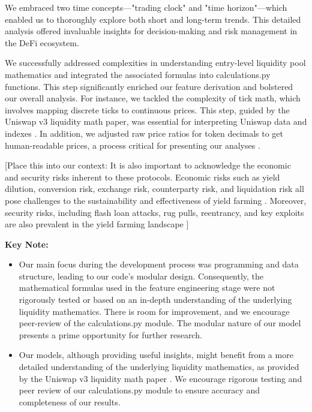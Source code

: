 \documentclass{article}
\begin{document}
We embraced two time concepts—"trading clock" and "time horizon"—which enabled us to thoroughly explore both short and long-term trends. This detailed analysis offered invaluable insights for decision-making and risk management in the DeFi ecosystem\cite{Miori2022}.

We successfully addressed complexities in understanding entry-level liquidity pool mathematics and integrated the associated formulas into calculations.py functions. This step significantly enriched our feature derivation and bolstered our overall analysis\cite{Elsts2021,Aigner2021}.
For instance, we tackled the complexity of tick math, which involves mapping discrete ticks to continuous prices. This step, guided by the Uniswap v3 liquidity math paper, was essential for interpreting Uniswap data and indexes \cite{Elsts2021}. In addition, we adjusted raw price ratios for token decimals to get human-readable prices, a process critical for presenting our analyses \cite{Elsts2021}.

[Place this into our context: It is also important to acknowledge the economic and security risks inherent to these protocols. Economic risks such as yield dilution, conversion risk, exchange risk, counterparty risk, and liquidation risk all pose challenges to the sustainability and effectiveness of yield farming \cite{Xu2023}. Moreover, security risks, including flash loan attacks, rug pulls, reentrancy, and key exploits are also prevalent in the yield farming landscape \cite{Xu2023}]

\textbf{Key Note:}
\begin{itemize}
\item Our main focus during the development process was programming and data structure, leading to our code's modular design. Consequently, the mathematical formulas used in the feature engineering stage were not rigorously tested or based on an in-depth understanding of the underlying liquidity mathematics. There is room for improvement, and we encourage peer-review of the calculations.py module. The modular nature of our model presents a prime opportunity for further research\cite{Elsts2021,Miori2023}.
\item Our models, although providing useful insights, might benefit from a more detailed understanding of the underlying liquidity mathematics, as provided by the Uniswap v3 liquidity math paper \cite{Elsts2021}. We encourage rigorous testing and peer review of our calculations.py module to ensure accuracy and completeness of our results\cite{Elsts2021,Miori2023}.
\end{itemize}
\end{document}
